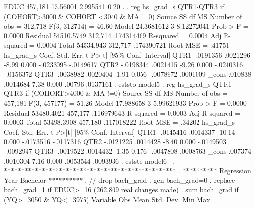         EDUC {\VBAR}    457,181    13.56001    2.995541          0         20
{\smallskip}
. 
. reg hs_grad_s QTR1-QTR3  if (COHORT>3000 \& COHORT <3040 \& MA !=0)
{\smallskip}
      Source {\VBAR}       SS           df       MS      Number of obs   =   312,718
   F(3, 312714)    =     46.60
       Model {\VBAR}  24.3681612         3  8.12272041   Prob > F        =    0.0000
    Residual {\VBAR}  54510.5749   312,714  .174314469   R-squared       =    0.0004
   Adj R-squared   =    0.0004
       Total {\VBAR}   54534.943   312,717  .174390721   Root MSE        =    .41751
{\smallskip}
   hs_grad_s {\VBAR}      Coef.   Std. Err.      t    P>|t|     [95\% Conf. Interval]
        QTR1 {\VBAR}  -.0191356   .0021296    -8.99   0.000    -.0233095   -.0149617
        QTR2 {\VBAR}  -.0198344   .0021415    -9.26   0.000    -.0240316   -.0156372
        QTR3 {\VBAR}  -.0038982   .0020404    -1.91   0.056    -.0078972    .0001009
       _cons {\VBAR}    .010838   .0014684     7.38   0.000       .00796    .0137161
{\smallskip}
. eststo model5
{\smallskip}
. reg hs_grad_s QTR1-QTR3  if (COHORT>4000 \& MA !=0)
{\smallskip}
      Source {\VBAR}       SS           df       MS      Number of obs   =   457,181
   F(3, 457177)    =     51.26
       Model {\VBAR}   17.988658         3  5.99621933   Prob > F        =    0.0000
    Residual {\VBAR}  53480.4021   457,177  .116979643   R-squared       =    0.0003
   Adj R-squared   =    0.0003
       Total {\VBAR}  53498.3908   457,180  .117018222   Root MSE        =    .34202
{\smallskip}
   hs_grad_s {\VBAR}      Coef.   Std. Err.      t    P>|t|     [95\% Conf. Interval]
        QTR1 {\VBAR}  -.0145416   .0014337   -10.14   0.000    -.0173516   -.0117316
        QTR2 {\VBAR}  -.0121225   .0014428    -8.40   0.000    -.0149503   -.0092947
        QTR3 {\VBAR}  -.0019522   .0014432    -1.35   0.176    -.0047808    .0008763
       _cons {\VBAR}    .007374   .0010304     7.16   0.000     .0053544    .0093936
{\smallskip}
. eststo model6
{\smallskip}
. 
. **************************************************
. **********  Regression Year Bachelor **********
. // drop bach_grad
. gen bach_grad=0
{\smallskip}
. replace bach_grad=1 if EDUC>=16
(262,809 real changes made)
{\smallskip}
. sum bach_grad if (YQ>=3050 \& YQ<=3975)
{\smallskip}
    Variable {\VBAR}        Obs        Mean    Std. Dev.       Min        Max
